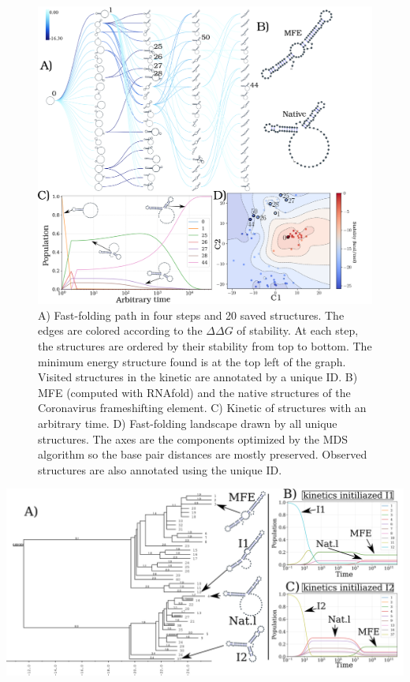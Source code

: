 \documentclass[a4paper,12pt]{article}
\begin{document}
\begin{figure}[h!]
\centering
\includegraphics[scale=0.18]{img/test_case.png}
\caption{\label{test_case}A) Fast-folding path in four steps and 20 saved structures. The edges are colored according to the \(\Delta \Delta G\) of stability. At each step, the structures are ordered by their stability from top to bottom. The minimum energy structure found is at the top left of the graph. Visited structures in the kinetic are annotated by a unique ID. B) MFE (computed with RNAfold) and the native structures of the Coronavirus frameshifting element. C) Kinetic of structures with an arbitrary time. D) Fast-folding landscape drawn by all unique structures. The axes are the components optimized by the MDS algorithm so the base pair distances are mostly preserved. Observed structures are also annotated using the unique ID.}
\end{figure}

\begin{center}
\includegraphics[width=.9\linewidth]{img/kinetic_treekin/kinetic_treekin.png}
\end{center}
\end{document}
